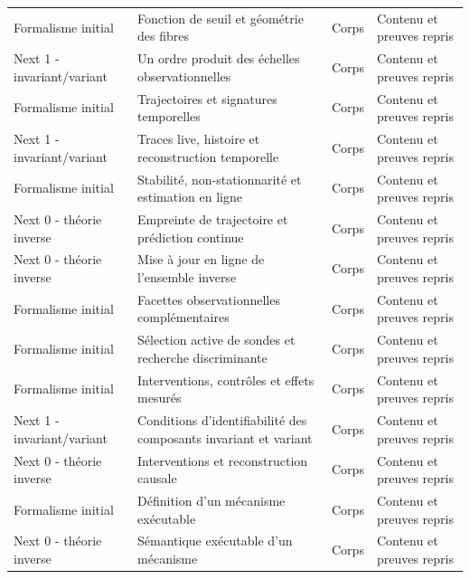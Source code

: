 \documentclass[11pt,oneside]{book}
\theoremstyle{definition}
\theoremstyle{remark}
\newcommand{\1}{\mathbf 1}
\begin{document}
\begin{longtable}{>{\raggedright\arraybackslash}p{} >{\raggedright\arraybackslash}p{} >{\raggedright\arraybackslash}p{} >{\raggedright\arraybackslash}p{}}
Formalisme initial & Fonction de seuil et géométrie des fibres & Corps & Contenu et preuves repris \\

Next 1 - invariant/variant & Un ordre produit des échelles observationnelles & Corps & Contenu et preuves repris \\

Formalisme initial & Trajectoires et signatures temporelles & Corps & Contenu et preuves repris \\

Next 1 - invariant/variant & Traces live, histoire et reconstruction temporelle & Corps & Contenu et preuves repris \\

Formalisme initial & Stabilité, non-stationnarité et estimation en ligne & Corps & Contenu et preuves repris \\

Next 0 - théorie inverse & Empreinte de trajectoire et prédiction continue & Corps & Contenu et preuves repris \\

Next 0 - théorie inverse & Mise à jour en ligne de l'ensemble inverse & Corps & Contenu et preuves repris \\

Formalisme initial & Facettes observationnelles complémentaires & Corps & Contenu et preuves repris \\

Formalisme initial & Sélection active de sondes et recherche discriminante & Corps & Contenu et preuves repris \\

Formalisme initial & Interventions, contrôles et effets mesurés & Corps & Contenu et preuves repris \\

Next 1 - invariant/variant & Conditions d'identifiabilité des composants invariant et variant & Corps & Contenu et preuves repris \\

Next 0 - théorie inverse & Interventions et reconstruction causale & Corps & Contenu et preuves repris \\

Formalisme initial & Définition d'un mécanisme exécutable & Corps & Contenu et preuves repris \\

Next 0 - théorie inverse & Sémantique exécutable d'un mécanisme & Corps & Contenu et preuves repris \\


\end{longtable}
\end{document}
